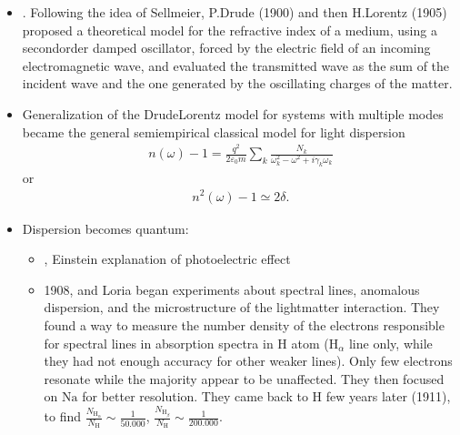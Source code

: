 \documentclass[letterpaper,10pt,english]{jupyterBook}
\begin{document}
\begin{itemize}
\begin{itemize}
\end{itemize}

\item {} 
\sphinxAtStartPar
{\hyperref[\detokenize{ch/quantum-mechanics/history/light-dispersion:quantum-mechanics-history-dispersion-classical-drude-lorentz}]{}}. Following the idea of Sellmeier, P.Drude (1900) and then H.Lorentz (1905) proposed a theoretical model for the refractive index of a medium, using a second\sphinxhyphen{}order damped oscillator, forced by the electric field of an incoming electromagnetic wave, and evaluated the transmitted wave as the sum of the incident wave and the one generated by the oscillating charges of the matter.

\item {} 
\sphinxAtStartPar
Generalization of the Drude\sphinxhyphen{}Lorentz model for systems with multiple modes became the general semi\sphinxhyphen{}empirical classical model for light dispersion
\begin{equation*}
\begin{split}n(\omega)-1 = \frac{q^2}{2 \varepsilon_0 m} \sum_k \frac{N_k}{\omega_k^2 - \omega^2 + i \gamma_k \omega_k}\end{split}
\end{equation*}
\sphinxAtStartPar
or
\begin{equation*}
\begin{split}n^2(\omega) - 1 \simeq 2 \delta .\end{split}
\end{equation*}
\item {} 
\sphinxAtStartPar
Dispersion becomes quantum:
\begin{itemize}
\item {} 
, Einstein explanation of photoelectric effect

\item {} 
\sphinxhyphen{}1908,  and Loria began experiments about spectral lines, anomalous dispersion, and the microstructure of the light\sphinxhyphen{}matter interaction. They found a way to measure the number density of the electrons responsible for spectral lines in absorption spectra in \(\text{H}\) atom (\(\text{H}_{\alpha}\) line only, while they had not enough accuracy for other weaker lines). Only few electrons resonate while the majority appear to be unaffected. They then focused on \(\text{Na}\) for better resolution. They came back to \(\text{H}\) few years later (1911), to find \(\frac{N_{\text{H}_{\alpha}}}{N_{\text{H}}} \sim \frac{1}{50.000}\), \(\frac{N_{\text{H}_{\beta}}}{N_{\text{H}}} \sim \frac{1}{200.000}\).


\end{itemize}
\end{itemize}
\end{document}

